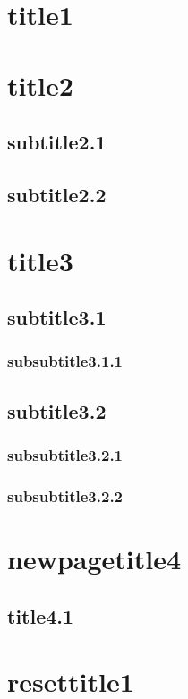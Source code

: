 \documentclass[a4paper,dvipdfmx]{jsarticle}
\begin{document}
\pagestyle{foot}

\section{title1}


\section{title2}
	\subsection{subtitle2.1}


	\subsection{subtitle2.2}


\section{title3}
	\subsection{subtitle3.1}
		\subsubsection{subsubtitle3.1.1}


	\subsection{subtitle3.2}
		\subsubsection{subsubtitle3.2.1}


		\subsubsection{subsubtitle3.2.2}

\newpage
\pagestyle{foot}
\addtocounter{page}{3}

\section{newpagetitle4}
	\subsection{title4.1}

\setcounter{section}{0}
	\section{resettitle1}
\end{document}
